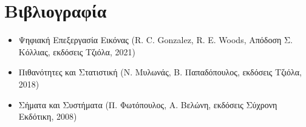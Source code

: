 \label{Chapter3}

\section*{Βιβλιογραφία}

\begin{itemize}
	\item Ψηφιακή Επεξεργασία Εικόνας (R. C. Gonzalez, R. E. Woods, Απόδοση Σ. Κόλλιας, εκδόσεις Τζιόλα, 2021)
	\item Πιθανότητες και Στατιστική (Ν. Μυλωνάς, Β. Παπαδόπουλος, εκδόσεις Τζιόλα, 2018)
	\item Σήματα και Συστήματα (Π. Φωτόπουλος, Α. Βελώνη, εκδόσεις Σύχρονη Εκδότικη, 2008)
\end{itemize}
